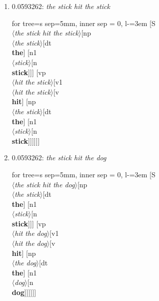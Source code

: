 \documentclass[11pt]{article}
\begin{document}
\begin{enumerate}
	\item  0.0593262: \textit{the stick hit the stick} \\[0.5em]
	\begin{adjustbox}{max width = \textwidth}
	\begin{forest}
	for tree={s sep=5mm, inner sep = 0, l-=3em}
	[S\\$\langle$\textit{the stick hit the stick}$\rangle$[np\\$\langle$\textit{the stick}$\rangle$[dt\\\textbf{the}] [n1\\$\langle$\textit{stick}$\rangle$[n\\\textbf{stick}]]] [vp\\$\langle$\textit{hit the stick}$\rangle$[v1\\$\langle$\textit{hit the stick}$\rangle$[v\\\textbf{hit}] [np\\$\langle$\textit{the stick}$\rangle$[dt\\\textbf{the}] [n1\\$\langle$\textit{stick}$\rangle$[n\\\textbf{stick}]]]]]]
	\end{forest}
	\end{adjustbox}
	\newpage

	\item  0.0593262: \textit{the stick hit the dog} \\[0.5em]
	\begin{adjustbox}{max width = \textwidth}
	\begin{forest}
	for tree={s sep=5mm, inner sep = 0, l-=3em}
	[S\\$\langle$\textit{the stick hit the dog}$\rangle$[np\\$\langle$\textit{the stick}$\rangle$[dt\\\textbf{the}] [n1\\$\langle$\textit{stick}$\rangle$[n\\\textbf{stick}]]] [vp\\$\langle$\textit{hit the dog}$\rangle$[v1\\$\langle$\textit{hit the dog}$\rangle$[v\\\textbf{hit}] [np\\$\langle$\textit{the dog}$\rangle$[dt\\\textbf{the}] [n1\\$\langle$\textit{dog}$\rangle$[n\\\textbf{dog}]]]]]]
	\end{forest}
	\end{adjustbox}
	\newpage


\end{enumerate}
\end{document}
